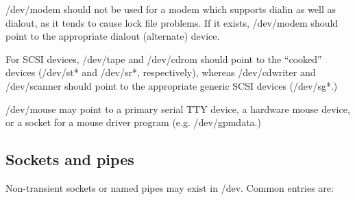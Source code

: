 \noindent
{\file /dev/modem} should not be used for a modem which supports
dialin as well as dialout, as it tends to cause lock file problems.
If it exists, {\file /dev/modem} should point to the appropriate
dialout (alternate) device.

For SCSI devices, {\file /dev/tape} and {\file /dev/cdrom} should
point to the ``cooked'' devices ({\file /dev/st*} and {\file
/dev/sr*}, respectively), whereas {\file /dev/cdwriter} and {\file
/dev/scanner} should point to the appropriate generic SCSI devices
({\file /dev/sg*}.)

{\file /dev/mouse} may point to a primary serial TTY device, a
hardware mouse device, or a socket for a mouse driver program
(e.g. {\file /dev/gpmdata}.)

\subsection{Sockets and pipes}

Non-transient sockets or named pipes may exist in {\file /dev}.
Common entries are:

\begin{nodelist}
\end{nodelist}



